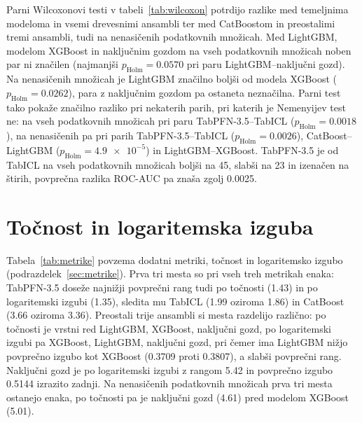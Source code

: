 \documentclass[a4paper,12pt,openright]{book}
\begin{document}
Parni Wilcoxonovi testi v tabeli~\ref{tab:wilcoxon} potrdijo razlike med
temeljnima modeloma in vsemi drevesnimi ansambli ter med CatBoostom in
preostalimi tremi ansambli, tudi na nenasičenih podatkovnih množicah. Med
LightGBM, modelom XGBoost in naključnim gozdom na vseh podatkovnih množicah
noben par ni značilen (najmanjši $p_\mathrm{Holm} = \num{0.0570}$ pri paru
LightGBM--naključni gozd). Na nenasičenih množicah je LightGBM značilno boljši od
modela XGBoost ($p_\mathrm{Holm} = \num{0.0262}$), para z naključnim gozdom pa
ostaneta neznačilna. Parni test tako pokaže značilno razliko pri nekaterih
parih, pri katerih je Nemenyijev test ne: na vseh podatkovnih množicah pri paru
TabPFN-3.5--TabICL ($p_\mathrm{Holm} = \num{0.0018}$), na nenasičenih pa pri
parih TabPFN-3.5--TabICL ($p_\mathrm{Holm} = \num{0.0026}$), CatBoost--LightGBM
($p_\mathrm{Holm} = \num{4.9e-5}$) in LightGBM--XGBoost. TabPFN-3.5 je od TabICL
na vseh podatkovnih množicah boljši na 45, slabši na 23 in izenačen na štirih,
povprečna razlika ROC-AUC pa znaša zgolj \num{0.0025}.


\FloatBarrier

\section{Točnost in logaritemska izguba}
\label{sec:rez-metrike}

Tabela~\ref{tab:metrike} povzema dodatni metriki, točnost in logaritemsko izgubo
(podrazdelek~\ref{sec:metrike}).
Prva tri mesta so pri vseh treh metrikah enaka: TabPFN-3.5 doseže najnižji
povprečni rang tudi po točnosti (\num{1.43}) in po logaritemski izgubi
(\num{1.35}), sledita mu TabICL (\num{1.99} oziroma \num{1.86}) in CatBoost
(\num{3.66} oziroma \num{3.36}). Preostali trije ansambli si mesta razdelijo
različno: po točnosti je vrstni red LightGBM, XGBoost, naključni gozd, po
logaritemski izgubi pa XGBoost, LightGBM, naključni gozd, pri čemer ima LightGBM
nižjo povprečno izgubo kot XGBoost (\num{0.3709} proti \num{0.3807}), a slabši
povprečni rang. Naključni gozd je po logaritemski izgubi z rangom \num{5.42} in
povprečno izgubo \num{0.5144} izrazito zadnji. Na nenasičenih podatkovnih
množicah prva tri mesta ostanejo enaka, po točnosti pa je naključni gozd
(\num{4.61}) pred modelom XGBoost (\num{5.01}).
\end{document}
